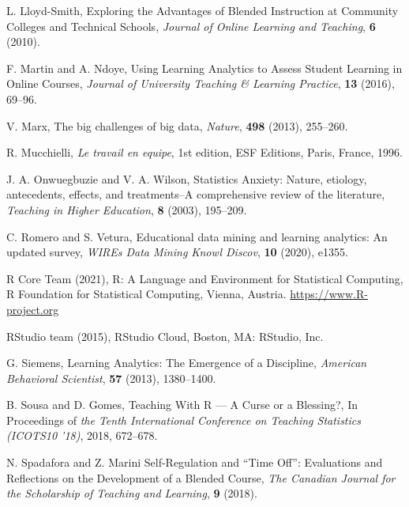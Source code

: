\documentclass{aims} %
\theoremstyle{definition}
\begin{document}
\begin{thebibliography}{99}
     \newblock  L. Lloyd-Smith,
     \newblock Exploring the Advantages of Blended Instruction at Community Colleges and Technical Schools,
     \newblock \emph{Journal of Online Learning and Teaching}, \textbf{6} (2010).

     \newblock  F. Martin and A. Ndoye,
     \newblock Using Learning Analytics to Assess Student Learning in Online Courses,
     \newblock \emph{Journal of University Teaching \& Learning Practice}, \textbf{13} (2016), 69--96.

     \newblock  V. Marx,
     \newblock The big challenges of big data,
     \newblock \emph{Nature}, \textbf{498} (2013), 255--260.

     \newblock R. Mucchielli,
     \newblock \emph{Le travail en equipe},
     \newblock 1st edition, ESF Editions, Paris, France, 1996.

     \newblock J. A. Onwuegbuzie  and V. A. Wilson,
     \newblock Statistics Anxiety: Nature, etiology, antecedents, effects, and treatments--A comprehensive review of the literature,
     \newblock \emph{Teaching in Higher Education}, \textbf{8} (2003), 195--209.

     \newblock C. Romero and S. Vetura,
     \newblock Educational data mining and learning analytics: An updated survey,
     \newblock \emph{WIREs Data Mining Knowl Discov}, \textbf{10} (2020), e1355.

     \newblock R Core Team (2021),
     \newblock R: A Language and Environment for Statistical Computing,
     \newblock R Foundation for
  Statistical Computing, Vienna, Austria. \url{
  https://www.R-project.org}

     \newblock RStudio team (2015),
     \newblock RStudio Cloud,
     \newblock Boston, MA: RStudio, Inc.

     \newblock G. Siemens,
     \newblock Learning Analytics: The Emergence of a Discipline,
     \newblock \emph{American Behavioral Scientist}, \textbf{57} (2013), 1380--1400.

     \newblock B. Sousa and D. Gomes,
     \newblock Teaching With R — A Curse or a Blessing?,
     \newblock In Proceedings of \emph{the Tenth International Conference on Teaching Statistics (ICOTS10 '18)}, 2018, 672–678.

     \newblock N. Spadafora and Z. Marini
     \newblock Self-Regulation and “Time Off”: Evaluations and Reflections on the Development of a Blended Course,
     \newblock \emph{The Canadian Journal for the Scholarship of Teaching and Learning}, \textbf{9} (2018).


\end{thebibliography}
\end{document}
